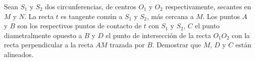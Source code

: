 Sean $S_1$ y $S_2$ dos circunferencias, de centros $O_1$ y $O_2$ respectivamente, secantes en $M$ y $N$. La recta $t$ es tangente común a $S_1$ y $S_2$, más cercana a $M$. Los puntos $A$ y $B$ son los respectivos puntos de contacto de $t$ con $S_1$ y $S_2$, $C$ el punto diametralmente opuesto a $B$ y $D$ el punto de intersección de la recta $O_1 O_2$ con la recta perpendicular a la recta $AM$ trazada por $B$. Demostrar que $M$, $D$ y $C$ están alineados.
